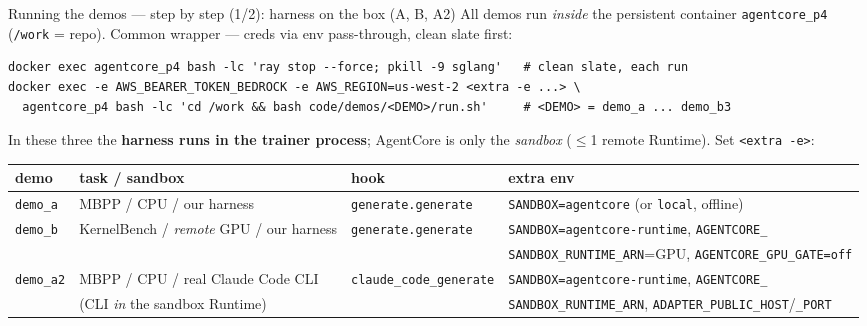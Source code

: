 \documentclass[aspectratio=169]{beamer}
\begin{document}
\begin{frame}[fragile]{Running the demos --- step by step (1/2): harness on the box (A, B, A2)}
  \footnotesize All demos run \emph{inside} the persistent container \texttt{agentcore\_p4}
  (\texttt{/work} = repo). Common wrapper --- creds via env pass-through, clean slate first:
\begin{lstlisting}[basicstyle=\ttfamily\scriptsize]
docker exec agentcore_p4 bash -lc 'ray stop --force; pkill -9 sglang'   # clean slate, each run
docker exec -e AWS_BEARER_TOKEN_BEDROCK -e AWS_REGION=us-west-2 <extra -e ...> \
  agentcore_p4 bash -lc 'cd /work && bash code/demos/<DEMO>/run.sh'     # <DEMO> = demo_a ... demo_b3
\end{lstlisting}
  \vspace{-0.2em}\scriptsize In these three the \textbf{harness runs in the trainer process}; AgentCore is only the \emph{sandbox} ($\le$1 remote Runtime). Set \texttt{<extra -e>}:
  \vspace{0.15em}
  \begin{center}\scriptsize
  \begin{tabular}{@{}llll@{}}
    \toprule
    \textbf{demo} & \textbf{task / sandbox} & \textbf{hook} & \textbf{extra env} \\
    \midrule
    \texttt{demo\_a}  & MBPP / CPU / our harness & \texttt{generate.generate} & \texttt{SANDBOX=agentcore} (or \texttt{local}, offline) \\
    \texttt{demo\_b}  & KernelBench / \emph{remote} GPU / our harness & \texttt{generate.generate} & \texttt{SANDBOX=agentcore-runtime}, \texttt{AGENTCORE\_} \\
                      &                              &                             & \texttt{SANDBOX\_RUNTIME\_ARN}=GPU, \texttt{AGENTCORE\_GPU\_GATE=off} \\
    \texttt{demo\_a2} & MBPP / CPU / real Claude Code CLI & \texttt{claude\_code\_generate} & \texttt{SANDBOX=agentcore-runtime}, \texttt{AGENTCORE\_} \\
                      & (CLI \emph{in} the sandbox Runtime) &                          & \texttt{SANDBOX\_RUNTIME\_ARN}, \texttt{ADAPTER\_PUBLIC\_HOST}/\texttt{\_PORT} \\
    \bottomrule
  \end{tabular}
  \end{center}
\end{frame}
\end{document}
